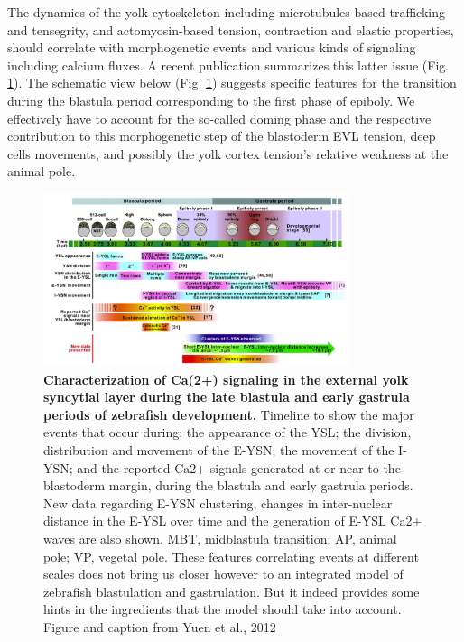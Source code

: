 The dynamics of the yolk cytoskeleton including microtubules-based trafficking and tensegrity, and actomyosin-based tension, contraction and elastic properties, should correlate with morphogenetic events and various kinds of signaling including calcium fluxes. A recent publication summarizes this latter issue (Fig. \ref{zebrafish_10h_review_yuen_2012}). The schematic view below (Fig. \ref{zebrafish_10h_review_yuen_2012}) suggests specific features for the transition during the blastula period corresponding to the first phase of epiboly. We effectively have to account for the so-called doming phase and the respective contribution to this morphogenetic step of the blastoderm EVL tension, deep cells movements, and possibly the yolk cortex tension's relative weakness at the animal pole.
\begin{figure}
\begin{center}
\includegraphics[width=0.8\textwidth]{../../images/zebrafish_10h_review/yuen_2012.png}
\end{center}
\caption{\textbf{Characterization of Ca(2+) signaling in the external yolk syncytial layer during the late blastula and early gastrula periods of zebrafish development. } Timeline to show the major events that occur during: the appearance of the YSL; the division, distribution and movement of the E-YSN; the movement of the I-YSN; and the reported Ca2+ signals generated at or near to the blastoderm margin, during the blastula and early gastrula periods. New data regarding E-YSN clustering, changes in inter-nuclear distance in the E-YSL over time and the generation of E-YSL Ca2+ waves are also shown. MBT, midblastula transition; AP, animal pole; VP, vegetal pole. These features correlating events at different scales does not bring us closer however to an integrated model of zebrafish blastulation and gastrulation. But it indeed provides some hints in the ingredients that the model should take into account. Figure and caption from Yuen et al., 2012 \cite{Yuen:2012fr}}
\label{zebrafish_10h_review_yuen_2012}
\end{figure}

